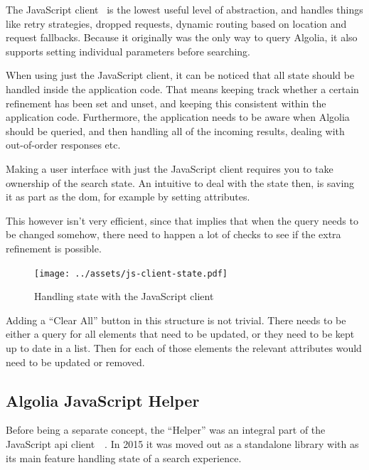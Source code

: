 The JavaScript client~\cite{algolia-js-client} is the lowest useful level of abstraction, and handles things like retry strategies, dropped requests, dynamic routing based on location and request fallbacks. Because it originally was the only way to query Algolia, it also supports setting individual parameters before searching.

When using just the JavaScript client, it can be noticed that all state should be handled inside the application code. That means keeping track whether a certain refinement has been set and unset, and keeping this consistent within the application code. Furthermore, the application needs to be aware when Algolia should be queried, and then handling all of the incoming results, dealing with out-of-order responses etc.

Making a user interface with just the JavaScript client requires you to take ownership of the search state. An intuitive to deal with the state then, is saving it as part as the \acrshort{dom}, for example by setting attributes.

This however isn't very efficient, since that implies that when the query needs to be changed somehow, there need to happen a lot of checks to see if the extra refinement is possible.

\begin{figure}[H]
  \centering
  \texttt{[image: ../assets/js-client-state.pdf]}
  \caption{Handling state with the JavaScript client}
  \label{figure:js-client-state}
\end{figure} %

Adding a ``Clear All'' button in this structure is not trivial. There needs to be either a query for all elements that need to be updated, or they need to be kept up to date in a list. Then for each of those elements the relevant attributes would need to be updated or removed.


\subsection{Algolia JavaScript Helper} %
\label{sub:algolia_js_helper}

Before being a separate concept, the ``Helper'' was an integral part of the JavaScript \acrshort{api} client~\cite{algolia-blog-js-client}~. In 2015 it was moved out as a standalone \gls{library} with as its main feature handling state of a search experience.

